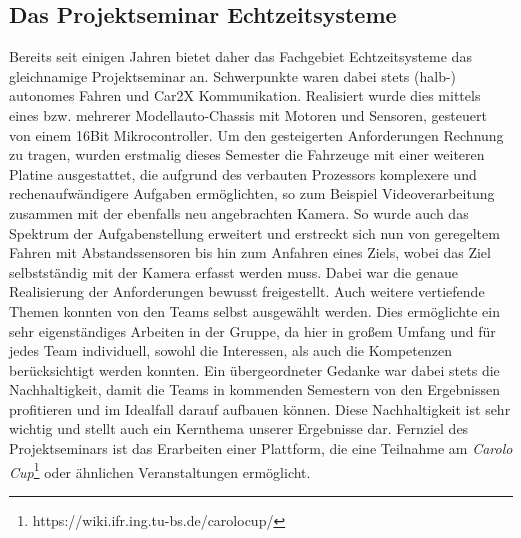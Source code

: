 \subsection{Das Projektseminar Echtzeitsysteme}
Bereits seit einigen Jahren bietet daher das Fachgebiet Echtzeitsysteme das gleichnamige Projektseminar an. Schwerpunkte waren dabei stets (halb-) autonomes Fahren und Car2X Kommunikation. Realisiert wurde dies mittels eines bzw. mehrerer Modellauto-Chassis mit Motoren und Sensoren, gesteuert von einem 16Bit Mikrocontroller. Um den gesteigerten Anforderungen Rechnung zu tragen, wurden erstmalig dieses Semester die Fahrzeuge mit einer weiteren Platine ausgestattet, die aufgrund des verbauten Prozessors komplexere und rechenaufwändigere Aufgaben ermöglichten, so zum Beispiel Videoverarbeitung zusammen mit der ebenfalls neu angebrachten Kamera. So wurde auch das Spektrum der Aufgabenstellung erweitert und erstreckt sich nun von geregeltem Fahren mit Abstandssensoren bis hin zum Anfahren eines Ziels, wobei das Ziel selbstständig mit der Kamera erfasst werden muss. Dabei war die genaue Realisierung der Anforderungen bewusst freigestellt. Auch weitere vertiefende Themen konnten von den Teams selbst ausgewählt werden. Dies ermöglichte ein sehr eigenständiges Arbeiten in der Gruppe, da hier in großem Umfang und für jedes Team individuell, sowohl die Interessen, als auch die Kompetenzen berücksichtigt werden konnten.
\pagebreak \newline
Ein übergeordneter Gedanke war dabei stets die Nachhaltigkeit, damit die Teams in kommenden Semestern von den Ergebnissen profitieren und im Idealfall darauf aufbauen können. Diese Nachhaltigkeit ist sehr wichtig und stellt auch ein Kernthema unserer Ergebnisse dar. Fernziel des Projektseminars ist das Erarbeiten einer Plattform, die eine Teilnahme am \textit{Carolo Cup}\footnote[1]{https://wiki.ifr.ing.tu-bs.de/carolocup/} oder ähnlichen Veranstaltungen ermöglicht.
